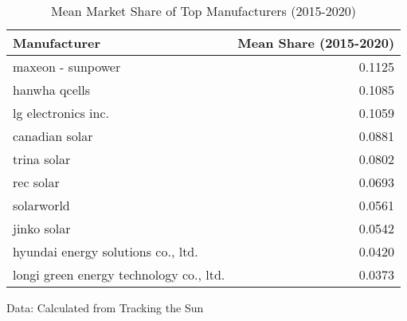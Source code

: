 \begin{table}[!t]
\caption*{
{\large Mean Market Share of Top Manufacturers (2015-2020)}
} 
\fontsize{12.0pt}{14.4pt}\selectfont
\begin{tabular*}{\linewidth}{@{\extracolsep{\fill}}lr}
\toprule
Manufacturer & Mean Share (2015-2020) \\ 
\midrule\addlinespace[2.5pt]
maxeon - sunpower & 0.1125 \\ 
hanwha qcells & 0.1085 \\ 
lg electronics inc. & 0.1059 \\ 
canadian solar & 0.0881 \\ 
trina solar & 0.0802 \\ 
rec solar & 0.0693 \\ 
solarworld & 0.0561 \\ 
jinko solar & 0.0542 \\ 
hyundai energy solutions co., ltd. & 0.0420 \\ 
longi green energy technology co., ltd. & 0.0373 \\ 
\bottomrule
\end{tabular*}
\begin{minipage}{\linewidth}
Data: Calculated from Tracking the Sun\\
\end{minipage}
\end{table}
